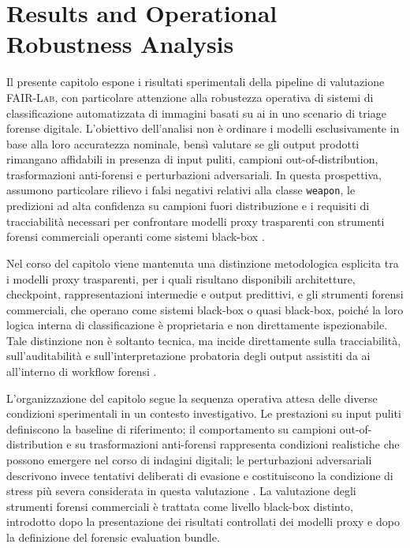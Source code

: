 \chapter{Results and Operational Robustness Analysis}
\label{chap:results}

Il presente capitolo espone i risultati sperimentali della pipeline di valutazione
\textsc{FAIR-Lab}, con particolare attenzione alla robustezza operativa di sistemi
di classificazione automatizzata di immagini basati su \gls{ai} in uno scenario di
triage forense digitale. L'obiettivo dell'analisi non è ordinare i modelli
esclusivamente in base alla loro accuratezza nominale, bensì valutare se gli
output prodotti rimangano affidabili in presenza di input puliti, campioni
out-of-distribution, trasformazioni anti-forensi e perturbazioni adversariali. In
questa prospettiva, assumono particolare rilievo i falsi negativi relativi alla
classe \texttt{weapon}, le predizioni ad alta confidenza su campioni fuori
distribuzione e i requisiti di tracciabilità necessari per confrontare modelli
proxy trasparenti con strumenti forensi commerciali operanti come sistemi
black-box \cite{costantini2019digital,sanna2024preliminary,sanna2025pixelperfect}.

Nel corso del capitolo viene mantenuta una distinzione metodologica esplicita
tra i modelli proxy trasparenti, per i quali risultano disponibili architetture,
checkpoint, rappresentazioni intermedie e output predittivi, e gli strumenti
forensi commerciali, che operano come sistemi black-box o quasi black-box, poiché
la loro logica interna di classificazione è proprietaria e non direttamente
ispezionabile. Tale distinzione non è soltanto tecnica, ma incide direttamente
sulla tracciabilità, sull'auditabilità e sull'interpretazione probatoria degli
output assistiti da \gls{ai} all'interno di workflow forensi
\cite{iso27041,iso27042,swgde2014validation}.

L'organizzazione del capitolo segue la sequenza operativa attesa delle diverse
condizioni sperimentali in un contesto investigativo. Le prestazioni su input
puliti definiscono la baseline di riferimento; il comportamento su campioni
out-of-distribution e su trasformazioni anti-forensi rappresenta condizioni
realistiche che possono emergere nel corso di indagini digitali; le perturbazioni
adversariali descrivono invece tentativi deliberati di evasione e costituiscono
la condizione di stress più severa considerata in questa valutazione
\cite{hendrycks2017baseline,hendrycks2019benchmarking,biggio2018wild}. La
valutazione degli strumenti forensi commerciali è trattata come livello
black-box distinto, introdotto dopo la presentazione dei risultati controllati dei
modelli proxy e dopo la definizione del forensic evaluation bundle.


